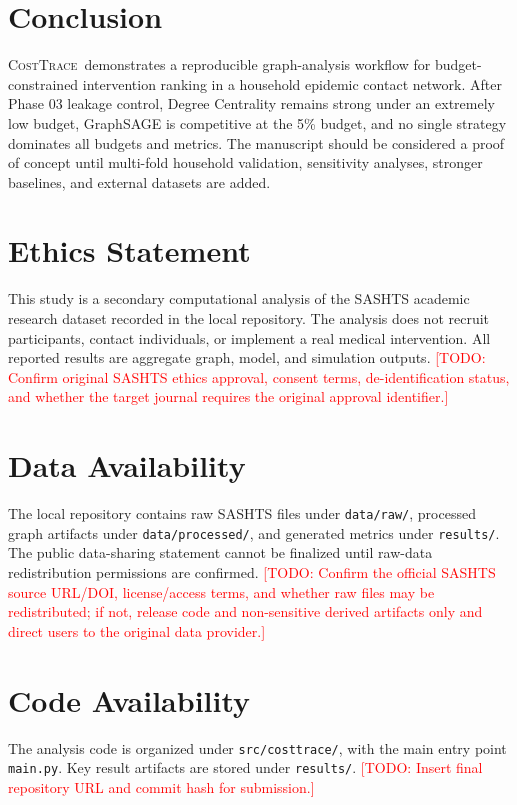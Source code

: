 \documentclass[11pt,a4paper]{article}
\newcommand{\TODO}[1]{\textcolor{red}{[TODO: #1]}}
\newcommand{\costtrace}{\textsc{CostTrace}}
\begin{document}
\section{Conclusion}

\costtrace\ demonstrates a reproducible graph-analysis workflow for budget-constrained intervention ranking in a household epidemic contact network. After Phase 03 leakage control, Degree Centrality remains strong under an extremely low budget, GraphSAGE is competitive at the 5\% budget, and no single strategy dominates all budgets and metrics. The manuscript should be considered a proof of concept until multi-fold household validation, sensitivity analyses, stronger baselines, and external datasets are added.

\section*{Ethics Statement}

This study is a secondary computational analysis of the SASHTS academic research dataset recorded in the local repository. The analysis does not recruit participants, contact individuals, or implement a real medical intervention. All reported results are aggregate graph, model, and simulation outputs. \TODO{Confirm original SASHTS ethics approval, consent terms, de-identification status, and whether the target journal requires the original approval identifier.}

\section*{Data Availability}

The local repository contains raw SASHTS files under \texttt{data/raw/}, processed graph artifacts under \texttt{data/processed/}, and generated metrics under \texttt{results/}. The public data-sharing statement cannot be finalized until raw-data redistribution permissions are confirmed. \TODO{Confirm the official SASHTS source URL/DOI, license/access terms, and whether raw files may be redistributed; if not, release code and non-sensitive derived artifacts only and direct users to the original data provider.}

\section*{Code Availability}

The analysis code is organized under \texttt{src/costtrace/}, with the main entry point \texttt{main.py}. Key result artifacts are stored under \texttt{results/}. \TODO{Insert final repository URL and commit hash for submission.}
\end{document}

